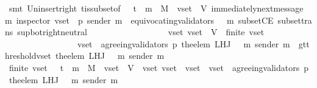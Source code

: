 \begin{isabellebody}
\ {\isacharparenleft}smt\ Un{\isacharunderscore}insert{\isacharunderscore}right\ {\isasymSigma}t{\isacharunderscore}is{\isacharunderscore}subset{\isacharunderscore}of{\isacharunderscore}{\isasymSigma}\ {\isacartoucheopen}{\isasymsigma}\ {\isasymin}\ {\isasymSigma}t\ {\isasymand}\ m\ {\isasymin}\ M\ {\isasymand}\ v{\isacharunderscore}set\ {\isasymsubseteq}\ V{\isacartoucheclose}\ {\isacartoucheopen}immediately{\isacharunderscore}next{\isacharunderscore}message\ {\isacharparenleft}{\isasymsigma}{\isacharcomma}\ m{\isacharparenright}{\isacartoucheclose}\ {\isacartoucheopen}inspector\ {\isacharparenleft}v{\isacharunderscore}set{\isacharcomma}\ {\isasymsigma}{\isacharcomma}\ p{\isacharparenright}{\isacartoucheclose}\ {\isacartoucheopen}sender\ m\ {\isasymnotin}\ equivocating{\isacharunderscore}validators\ {\isacharparenleft}{\isasymsigma}\ {\isasymunion}\ {\isacharbraceleft}m{\isacharbraceright}{\isacharparenright}{\isacartoucheclose}\ subsetCE\ subset{\isacharunderscore}trans\ sup{\isacharunderscore}bot{\isachardot}right{\isacharunderscore}neutral{\isacharparenright}\ \ \ \ \ \ \ \ \isanewline
\ \ \ \ \ \ \isamarkupfalse%
\ \isamarkupfalse%
\ {\isachardoublequoteopen}{\isasymexists}\ v{\isacharunderscore}set{\isacharprime}{\isachardot}\ v{\isacharunderscore}set{\isacharprime}\ {\isasymsubseteq}\ V\ {\isasymand}\ finite\ v{\isacharunderscore}set{\isacharprime}\ \isanewline
\ \ \ \ \ \ \ \ \ \ \ \ \ \ \ \ {\isasymand}\ v{\isacharunderscore}set{\isacharprime}\ {\isasymsubseteq}\ agreeing{\isacharunderscore}validators\ {\isacharparenleft}p{\isacharcomma}\ the{\isacharunderscore}elem\ {\isacharparenleft}L{\isacharunderscore}H{\isacharunderscore}J\ {\isacharparenleft}{\isasymsigma}\ {\isasymunion}\ {\isacharbraceleft}m{\isacharbraceright}{\isacharparenright}\ {\isacharparenleft}sender\ m{\isacharparenright}{\isacharparenright}{\isacharparenright}\ {\isasymand}\ gt{\isacharunderscore}threshold{\isacharparenleft}v{\isacharunderscore}set{\isacharprime}{\isacharcomma}\ the{\isacharunderscore}elem\ {\isacharparenleft}L{\isacharunderscore}H{\isacharunderscore}J\ {\isacharparenleft}{\isasymsigma}\ {\isasymunion}\ {\isacharbraceleft}m{\isacharbraceright}{\isacharparenright}\ {\isacharparenleft}sender\ m{\isacharparenright}{\isacharparenright}{\isacharparenright}{\isachardoublequoteclose}\isanewline
\ \ \ \ \ \ \ \ \isamarkupfalse%
\ {\isacartoucheopen}finite\ v{\isacharunderscore}set{\isacartoucheclose}\ {\isacartoucheopen}{\isasymsigma}\ {\isasymin}\ {\isasymSigma}t\ {\isasymand}\ m\ {\isasymin}\ M\ {\isasymand}\ v{\isacharunderscore}set\ {\isasymsubseteq}\ V{\isacartoucheclose}\ {\isacartoucheopen}{\isasymforall}\ v{\isacharunderscore}set{\isacharprime}{\isachardot}\ v{\isacharunderscore}set{\isacharprime}\ {\isasymsubseteq}\ v{\isacharunderscore}set\ {\isasymlongrightarrow}\ v{\isacharunderscore}set{\isacharprime}\ {\isasymsubseteq}\ agreeing{\isacharunderscore}validators\ {\isacharparenleft}p{\isacharcomma}\ the{\isacharunderscore}elem\ {\isacharparenleft}L{\isacharunderscore}H{\isacharunderscore}J\ {\isacharparenleft}{\isasymsigma}\ {\isasymunion}\ {\isacharbraceleft}m{\isacharbraceright}{\isacharparenright}\ {\isacharparenleft}sender\ m{\isacharparenright}{\isacharparenright}{\isacharparenright}{\isacartoucheclose}\isanewline

\end{isabellebody}
